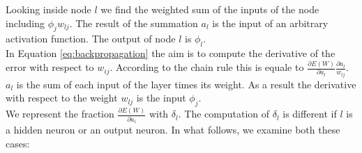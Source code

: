Looking inside node $l$ we find the weighted sum of the inputs of the node including $\phi_j w_{lj}$. The result of the summation $a_l$ is the input of an arbitrary activation function. The output of node $l$ is $\phi_l$.\\
In Equation \ref{eq:backpropagation} the aim is to compute the derivative of the error with respect to $w_{ij}$. According to the chain rule this is equale to $\frac{\partial E(W)}{\partial a_l} \frac{\partial a_l}{w_{lj}}$. $a_l$ is the sum of each input of the layer times its weight. As a result the derivative with respect to the weight $w_{lj}$ is the input $\phi_j$. \\
We represent the fraction $\frac{\partial E(W)}{\partial a_i}$ with $\delta_l$. The computation of $\delta_l$ is different if $l$ is a hidden neuron or an output neuron. In what follows, we examine both these cases:
